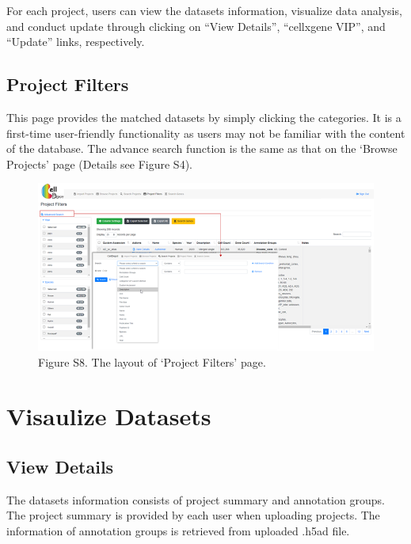 \documentclass[
]{book}
\begin{document}
For each project, users can view the datasets information, visualize data analysis, and conduct update through clicking on ``View Details'', ``cellxgene VIP'', and ``Update'' links, respectively.

\hypertarget{project-filters}{%
\subsection{Project Filters}\label{project-filters}}

This page provides the matched datasets by simply clicking the categories. It is a first-time user-friendly functionality as users may not be familiar with the content of the database. The advance search function is the same as that on the `Browse Projects' page (Details see Figure S4).

\begin{figure}
\centering
\includegraphics{figures/S8.png}
\caption{Figure S8. The layout of `Project Filters' page.}
\end{figure}

\hypertarget{visaulize-datasets}{%
\section{Visaulize Datasets}\label{visaulize-datasets}}

\hypertarget{view-details}{%
\subsection{View Details}\label{view-details}}

The datasets information consists of project summary and annotation groups. The project summary is provided by each user when uploading projects. The information of annotation groups is retrieved from uploaded .h5ad file.
\end{document}
